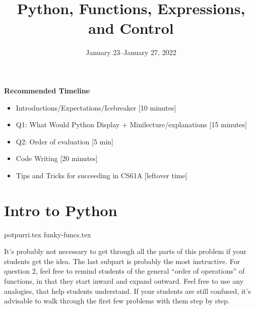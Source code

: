 \documentclass{exam}
\title{Python, Functions, Expressions, and Control}
\date{January 23--January 27, 2022}
\begin{document}
\maketitle
\begin{meta}
\textbf{Recommended Timeline}
\begin{itemize}
  \item Introductions/Expectations/Icebreaker [10 minutes]
  \item Q1: What Would Python Display + Minilecture/explanations [15 minutes]
  \item Q2: Order of evaluation [5 min]
  \item Code Writing [20 minutes]
  \item Tips and Tricks for succeeding in CS61A [leftover time]
\end{itemize}
\end{meta}


\section{Intro to Python}
\begin{questions}
{potpurri.tex}
{funky-funcs.tex}
\begin{questionmeta}
  It's probably not necessary to get through all the parts of this problem if your students get the idea. The last subpart is probably the most instructive. 
  For question 2, feel free to remind students of the general ``order of operations'' of functions, in that they start inward and expand outward. Feel free to use any analogies, that help students understand.
  If your students are still confused, it's advisable to walk through the first few problems with them step by step.
\end{questionmeta}
\end{questions}
\end{document}
